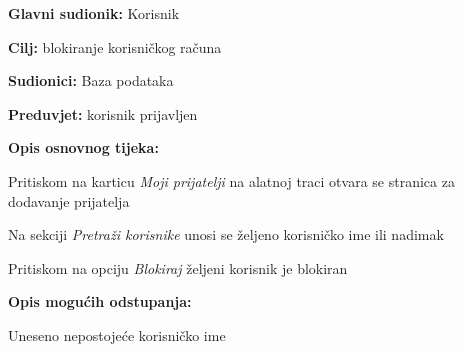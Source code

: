 					\noindent {}
					\begin{packed_item}
						
						\item \textbf{Glavni sudionik: }Korisnik
						\item  \textbf{Cilj:} blokiranje korisničkog računa
						\item  \textbf{Sudionici:}
						Baza podataka
						\item  \textbf{Preduvjet:} korisnik prijavljen
						\item  \textbf{Opis osnovnog tijeka:}
						
						\item[] \begin{packed_enum}
							
							\item	Pritiskom na karticu \textit{Moji prijatelji} na alatnoj traci otvara se stranica za dodavanje prijatelja
							\item	Na sekciji \textit{Pretraži korisnike} unosi se željeno korisničko ime ili nadimak
							\item	Pritiskom na opciju \textit{Blokiraj} željeni korisnik je blokiran
							
						\end{packed_enum}
						
						\item  \textbf{Opis mogućih odstupanja:}
						
						\item[] \begin{packed_item}
							
							\item[2.a] Uneseno nepostojeće korisničko ime
							
						\end{packed_item}
					\end{packed_item}
					
